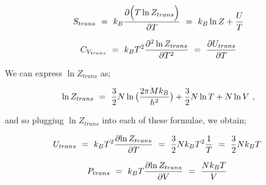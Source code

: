 \documentclass{article}
\begin{document}
\begin{equation} \label{eq:256}
S_{trans} \hspace{0.125cm} = \hspace{0.125cm} k_B \frac{\partial{\Big( T \ln{Z_{trans}}} \Big)}{\partial{T}} \hspace{0.125cm} = \hspace{0.125cm} k_B \ln{Z} + \frac{U}{T}
\end{equation}

\begin{equation} \label{eq:256}
C_{V_{trans}} \hspace{0.125cm} = \hspace{0.125cm} k_B T^2 \frac{\partial^2 \ln{Z_{trans}}}{\partial{T}^2} \hspace{0.125cm} = \hspace{0.125cm} \frac{\partial{U_{trans}}}{\partial{T}}
\end{equation}

We can express \begin{math} \ln{Z_{trans}} \end{math} as;

\begin{equation} \label{eq:256}
\ln{Z_{trans}} \hspace{0.125cm} = \hspace{0.125cm} \frac{3}{2} N \ln \big( \frac{2 \pi M k_B}{h^2} \big) + \frac{3}{2} N \ln T  + N \ln V \hspace{0.125cm} , 
\end{equation}

and so plugging \begin{math} \ln{Z_{trans}} \end{math} into each of these formulae, we obtain;

\begin{equation} \label{eq:256}
U_{trans} \hspace{0.125cm} = \hspace{0.125cm} k_B T^2 \frac{\partial{\ln{Z_{trans}}}}{\partial{T}} \hspace{0.125cm} = \hspace{0.125cm} \frac{3}{2} N k_B T^2 \frac{1}{T} \hspace{0.125cm} = \hspace{0.125cm} \frac{3}{2} N k_B T \hspace{0.125cm}
\end{equation}

\begin{equation} \label{eq:256}
P_{trans} \hspace{0.125cm} = \hspace{0.125cm} k_B T \frac{\partial{\ln{Z_{trans}}}}{\partial{V}} \hspace{0.125cm} = \hspace{0.125cm} \frac{N k_B T}{V} \hspace{0.125cm}
\end{equation}
\end{document}
